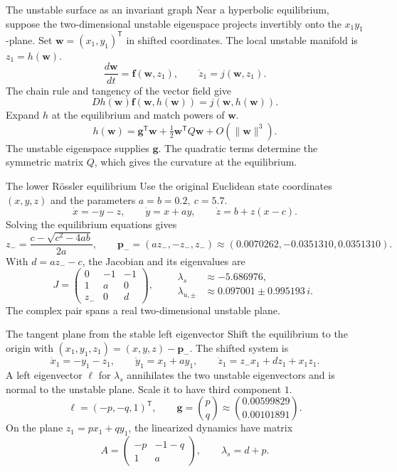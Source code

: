 \documentclass[11pt,aspectratio=169]{beamer}
\newcommand{\vect}[1]{\bm{#1}}
\newcommand{\Rossler}{R\"ossler}
\begin{document}
\begin{frame}{The unstable surface as an invariant graph}
Near a hyperbolic equilibrium, suppose the two-dimensional unstable
eigenspace projects invertibly onto the \(x_1y_1\)-plane.
Set \(\vect{w}=(x_1,y_1)^{\mathsf T}\) in shifted coordinates. The local
unstable manifold is \(z_1=h(\vect{w})\).
\[
    \frac{d\vect{w}}{dt}=\vect{f}(\vect{w},z_1),\qquad \dot{z}_1=j(\vect{w},z_1).
\]
The chain rule and tangency of the vector field give
\[
    Dh(\vect{w})\vect{f}(\vect{w},h(\vect{w}))=j(\vect{w},h(\vect{w})).
\]
Expand \(h\) at the equilibrium and match powers of \(\vect{w}\).
\[
    h(\vect{w})=\vect{g}^{\mathsf T}\vect{w}+\tfrac12 \vect{w}^{\mathsf T}Q\vect{w}+O(\|\vect{w}\|^3).
\]
The unstable eigenspace supplies \(\vect{g}\). The quadratic terms determine
the symmetric matrix \(Q\), which gives the curvature at the equilibrium.
\end{frame}

\begin{frame}{The lower \Rossler{} equilibrium}
\small
Use the original Euclidean state coordinates \((x,y,z)\) and
the parameters \(a=b=0.2,\ c=5.7\).
\[
  \dot x=-y-z,\qquad \dot y=x+ay,\qquad \dot z=b+z(x-c).
\]
Solving the equilibrium equations gives
\[
  z_-=\frac{c-\sqrt{c^2-4ab}}{2a},\qquad
  \vect{p}_-=(az_-,-z_-,z_-)\approx(0.0070262,-0.0351310,0.0351310).
\]
With \(d=az_--c\), the Jacobian and its eigenvalues are
\[
 J=\begin{pmatrix}0&-1&-1\\1&a&0\\z_-&0&d\end{pmatrix},
 \qquad
 \begin{aligned}
 \lambda_s&\approx-5.686976,\\
 \lambda_{u,\pm}&\approx0.097001\pm0.995193\,i.
 \end{aligned}
\]
The complex pair spans a real two-dimensional unstable plane.
\end{frame}

\begin{frame}{The tangent plane from the stable left eigenvector}
Shift the equilibrium to the origin with \((x_1,y_1,z_1)=(x,y,z)-\vect{p}_-\).
The shifted system is
\[
   \dot{x}_1=-y_1-z_1,\qquad \dot{y}_1=x_1+ay_1,\qquad
   \dot{z}_1=z_-x_1+dz_1+x_1z_1.
\]
A left eigenvector \(\vect{\ell}\) for \(\lambda_s\) annihilates the two
unstable eigenvectors and is normal to the unstable plane.
Scale it to have third component \(1\).
\[
  \vect{\ell}=(-p,-q,1)^{\mathsf T},\qquad
  \vect{g}=\binom{p}{q}\approx\binom{0.00599829}{0.00101891}.
\]
On the plane \(z_1=px_1+qy_1\), the linearized dynamics have matrix
\[
 A=\begin{pmatrix}-p&-1-q\\1&a\end{pmatrix},
 \qquad \lambda_s=d+p .
\]
\end{frame}
\end{document}
